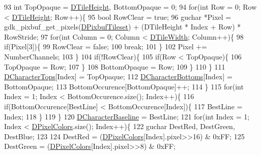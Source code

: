 \begin{DoxyCode}
{93             \textcolor{keywordtype}{int} TopOpaque = \hyperlink{classCGraphicTileset_af48f32e07d5fe69afd5f764318cc3244}{DTileHeight}, BottomOpaque = 0;
94             \textcolor{keywordflow}{for}(\textcolor{keywordtype}{int} Row = 0; Row < \hyperlink{classCGraphicTileset_af48f32e07d5fe69afd5f764318cc3244}{DTileHeight}; Row++)\{
95                 \textcolor{keywordtype}{bool} RowClear = \textcolor{keyword}{true};
96                 guchar *Pixel = gdk\_pixbuf\_get\_pixels(\hyperlink{classCGraphicTileset_a5d5adfcdbb347a6df3f57535ca08e3ef}{DPixbufTileset}) + (DTileHeight * Index 
      + Row) * RowStride;
97                 \textcolor{keywordflow}{for}(\textcolor{keywordtype}{int} Column = 0; Column < \hyperlink{classCGraphicTileset_a2d0c7d19865b81911a3a43d5cae50e00}{DTileWidth}; Column++)\{
98                     \textcolor{keywordflow}{if}(Pixel[3])\{
99                         RowClear = \textcolor{keyword}{false};
100                         \textcolor{keywordflow}{break};      
101                     \}
102                     Pixel += NumberChannels;   
103                 \}
104                 \textcolor{keywordflow}{if}(!RowClear)\{
105                     \textcolor{keywordflow}{if}(Row < TopOpaque)\{
106                         TopOpaque = Row;
107                     \}
108                     BottomOpaque = Row;
109                 \}
110             \}
111             \hyperlink{classCFontTileset_aa009ebe41a491d854a5f6005919649c2}{DCharacterTops}[Index] = TopOpaque;
112             \hyperlink{classCFontTileset_a13d7063022d59bf3347452c78be50a8b}{DCharacterBottoms}[Index] = BottomOpaque;
113             BottomOccurence[BottomOpaque]++;
114         \}
115         \textcolor{keywordflow}{for}(\textcolor{keywordtype}{int} Index = 1; Index < BottomOccurence.size(); Index++)\{
116             \textcolor{keywordflow}{if}(BottomOccurence[BestLine] < BottomOccurence[Index])\{
117                 BestLine = Index;
118             \}
119         \}
120         \hyperlink{classCFontTileset_aba19d07744c08aeb957728067c52466c}{DCharacterBaseline} = BestLine;
121         \textcolor{keywordflow}{for}(\textcolor{keywordtype}{int} Index = 1; Index < \hyperlink{classCGraphicTileset_a4e9672b8b133dbac600fb8bb400d1cb3}{DPixelColors}.size(); Index++)\{
122             guchar DestRed, DestGreen, DestBlue;
123         
124             DestRed = (\hyperlink{classCGraphicTileset_a4e9672b8b133dbac600fb8bb400d1cb3}{DPixelColors}[Index].pixel>>16) & 0xFF;
125             DestGreen = (\hyperlink{classCGraphicTileset_a4e9672b8b133dbac600fb8bb400d1cb3}{DPixelColors}[Index].pixel>>8) & 0xFF;
}
\end{DoxyCode}
